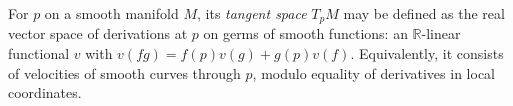 
For $p$ on a smooth manifold $M$, its \emph{tangent space} $T_pM$ may be defined as the real vector space of derivations at $p$ on germs of smooth functions: an $\mathbb R$-linear functional $v$ with $v(fg)=f(p)v(g)+g(p)v(f)$. Equivalently, it consists of velocities of smooth curves through $p$, modulo equality of derivatives in local coordinates.

